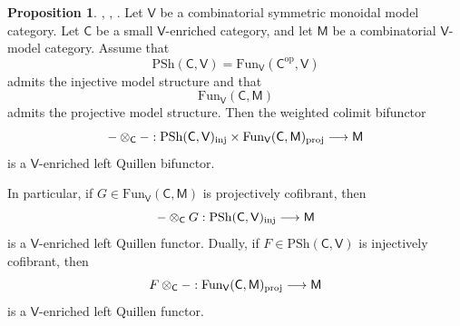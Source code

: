 \documentclass{amsart}
\newcommand{\cat}[1]{\mathsf{#1}}
\newcommand{\proj}{\textnormal{proj}}
\newcommand{\inj}{\textnormal{inj}}
\newcommand{\Fun}{\mathrm{Fun}}
\newcommand{\psh}{\mathrm{PSh}}
\renewcommand{\op}{\mathrm{op}}
\theoremstyle{definition}
\newtheorem{proposition}[equation]{Proposition}
\numberwithin{equation}{subsection}
\numberwithin{subsubsection}{subsection}
\begin{document}
\begin{proposition}\label{prop:weighted.colimit.quillen.bifunctor}
  \textnormal{\cite[Theorem 21.1]{Shu06}},
  \textnormal{\cite[Proposition~A.2.9.26~and~Remark~A.2.9.27]{Lur17b}},
  \textnormal{\cite[Theorem~3.2]{Gam10}}.
  Let \(\cat{V}\) be a combinatorial symmetric monoidal model category. Let
  \(\cat{C}\) be a small \(\cat{V}\)-enriched category, and let
  \(\cat{M}\) be a combinatorial \(\cat{V}\)-model category.
  Assume that
  \[
    \psh(\cat{C},\cat{V})
    =
    \Fun_{\cat{V}}(\cat{C}^{\op},\cat{V})
  \]
  admits the injective model structure and that
  \[
    \Fun_{\cat{V}}(\cat{C},\cat{M})
  \]
  admits the projective model structure.
  Then the weighted
  colimit bifunctor
  \[
    -\otimes_\cat{C} - :
    \psh(\cat{C},\cat{V})_{\inj}
    \times
    \Fun_{\cat{V}}(\cat{C},\cat{M})_{\proj}
    \longrightarrow
    \cat{M}
  \]
  is a \(\cat{V}\)-enriched left Quillen bifunctor.

  In particular, if \(G\in \Fun_{\cat{V}}(\cat{C},\cat{M})\) is projectively
  cofibrant, then
  \[
    -\otimes_\cat{C} G :
    \psh(\cat{C},\cat{V})_{\inj}
    \longrightarrow
    \cat{M}
  \]
  is a \(\cat{V}\)-enriched left Quillen functor. Dually, if
  \(F\in\psh(\cat{C},\cat{V})\) is injectively cofibrant, then
  \[
    F\otimes_\cat{C} - :
    \Fun_{\cat{V}}(\cat{C},\cat{M})_{\proj}
    \longrightarrow
    \cat{M}
  \]
  is a \(\cat{V}\)-enriched left Quillen functor.
\end{proposition}
\end{document}
